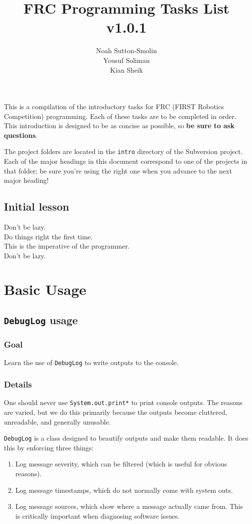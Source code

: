 \documentclass[a4paper]{article}
\title{FRC Programming Tasks List v1.0.1}
\author{Noah Sutton-Smolin\\Yousuf Soliman\\Kian Sheik}
\begin{document}
\setcounter{tocdepth}{2}\maketitle\tableofcontents\pagebreak

This is a compilation of the introductory tasks for FRC (FIRST Robotics Competition) programming. Each of these tasks are to be completed in order. This introduction is designed to be as concise as possible, so \textbf{be sure to ask questions}.

The project folders are located in the \lstinline{intro} directory of the Subversion project. Each of the major headings in this document correspond to one of the projects in that folder; be sure you're using the right one when you advance to the next major heading!

\subsection{Initial lesson}
Don't be lazy.\\Do things right the first time.\\This is the imperative of the programmer.\\Don't be lazy.

\pagebreak\section{Basic Usage}
\subsection{\lstinline{DebugLog} usage}
\subsubsection{Goal} Learn the use of \lstinline{DebugLog} to write outputs to the console.
\subsubsection{Details} One should never use \lstinline{System.out.print*} to print console outputs. The reasons are varied, but we do this primarily because the outputs become cluttered, unreadable, and generally unusable. 

\lstinline{DebugLog} is a class designed to beautify outputs and make them readable. It does this by enforcing three things:
\begin{enumerate}\item{Log message severity, which can be filtered (which is useful for obvious reasons).}\item{Log message timestamps, which do not normally come with system outs.}\item{Log message sources, which show where a message actually came from. This is critically important when diagnosing software issues.}\end{enumerate}
\end{document}
